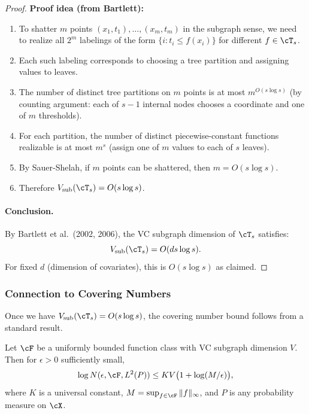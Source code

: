 \begin{proof}
\textbf{Proof idea (from Bartlett):}
\begin{enumerate}
\item To shatter $m$ points $(x_1, t_1), \ldots, (x_m, t_m)$ in the subgraph sense, we need to realize all $2^m$ labelings of the form $\{i : t_i \le f(x_i)\}$ for different $f \in \cT_s$.
\item Each such labeling corresponds to choosing a tree partition and assigning values to leaves.
\item The number of distinct tree partitions on $m$ points is at most $m^{O(s \log s)}$ (by counting argument: each of $s-1$ internal nodes chooses a coordinate and one of $m$ thresholds).
\item For each partition, the number of distinct piecewise-constant functions realizable is at most $m^s$ (assign one of $m$ values to each of $s$ leaves).
\item By Sauer-Shelah, if $m$ points can be shattered, then $m = O(s \log s)$.
\item Therefore $V_{\text{sub}}(\cT_s) = O(s \log s)$.
\end{enumerate}

\paragraph{Conclusion.}
By Bartlett et al.\ (2002, 2006), the VC subgraph dimension of $\cT_s$ satisfies:
\[
V_{\text{sub}}(\cT_s) = O(ds \log s).
\]
For fixed $d$ (dimension of covariates), this is $O(s \log s)$ as claimed.
\end{proof}

\subsubsection*{Connection to Covering Numbers}

Once we have $V_{\text{sub}}(\cT_s) = O(s \log s)$, the covering number bound follows from a standard result.

\begin{corollary}
\label{cor:covering}
Let $\cF$ be a uniformly bounded function class with VC subgraph dimension $V$. Then for $\epsilon > 0$ sufficiently small,
\[
\log N(\epsilon, \cF, L^2(P)) \le K V \bigl( 1 + \log(M/\epsilon) \bigr),
\]
where $K$ is a universal constant, $M = \sup_{f \in \cF} \|f\|_\infty$, and $P$ is any probability measure on $\cX$.
\end{corollary}

